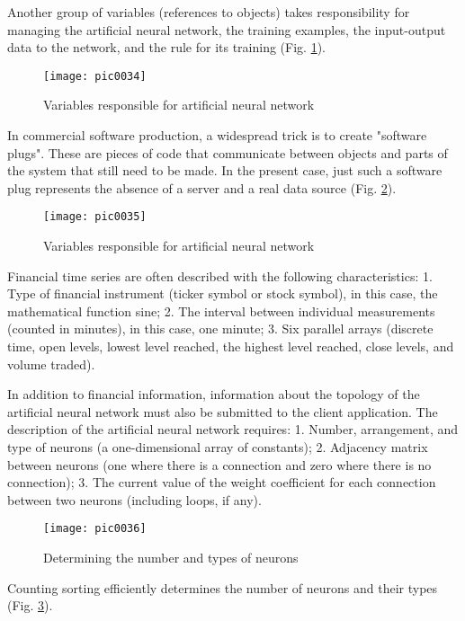Another group of variables (references to objects) takes responsibility for managing the artificial neural network, the training examples, the input-output data to the network, and the rule for its training (Fig. \ref{fig:pic0034}).

\begin{figure}[h]
\centering
\texttt{[image: pic0034]}
\caption{Variables responsible for artificial neural network}
\label{fig:pic0034}
\end{figure}
\FloatBarrier

In commercial software production, a widespread trick is to create "software plugs". These are pieces of code that communicate between objects and parts of the system that still need to be made. In the present case, just such a software plug represents the absence of a server and a real data source (Fig. \ref{fig:pic0035}).

\begin{figure}[h]
\centering
\texttt{[image: pic0035]}
\caption{Variables responsible for artificial neural network}
\label{fig:pic0035}
\end{figure}
\FloatBarrier

Financial time series are often described with the following characteristics: 1. Type of financial instrument (ticker symbol or stock symbol), in this case, the mathematical function sine; 2. The interval between individual measurements (counted in minutes), in this case, one minute; 3. Six parallel arrays (discrete time, open levels, lowest level reached, the highest level reached, close levels, and volume traded).

In addition to financial information, information about the topology of the artificial neural network must also be submitted to the client application. The description of the artificial neural network requires: 1. Number, arrangement, and type of neurons (a one-dimensional array of constants); 2. Adjacency matrix between neurons (one where there is a connection and zero where there is no connection); 3. The current value of the weight coefficient for each connection between two neurons (including loops, if any).

\begin{figure}[h]
\centering
\texttt{[image: pic0036]}
\caption{Determining the number and types of neurons}
\label{fig:pic0036}
\end{figure}
\FloatBarrier

Counting sorting efficiently determines the number of neurons and their types (Fig. \ref{fig:pic0036}).

